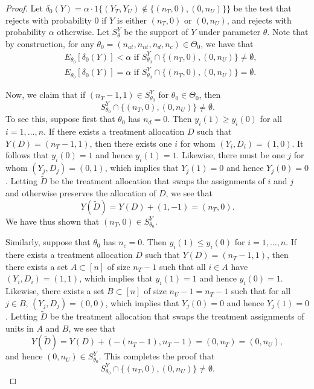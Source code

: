 \documentclass[12pt,reqno]{amsart}
\begin{document}
\propunbiasedexists*
\begin{proof}
Let $\delta_0(Y) = \alpha \cdot 1\{ (Y_T,Y_U) \not\in \{ (n_T,0), (0,n_U) \} \} $ be the test that rejects with probability $0$ if $Y$ is either $(n_T,0)$ or $(0,n_U)$, and rejects with probability $\alpha$ otherwise. Let $S^Y_\theta$ be the support of $Y$ under parameter $\theta$. Note that by construction, for any $\theta_0 = (n_{at},n_{nt}, n_d, n_c) \in \Theta_0$, we have that 
\begin{align*}
& E_{\theta_0 }[\delta_0(Y)]  < \alpha \text{ if } S^Y_{\theta_0} \cap  \{ (n_T,0), (0,n_U) \} \neq \emptyset, \\
& E_{\theta_0 }[\delta_0(Y)]  =  \alpha \text{ if } S^Y_{\theta_0} \cap  \{ (n_T,0), (0,n_U) \}  = \emptyset .
\end{align*}

Now, we claim that if $(n_T -1 , 1) \in S_{\theta_0}^Y$ for $\theta_0 \in \Theta_0$, then
\[
S^Y_{\theta_0} \cap  \{ (n_T,0), (0,n_U) \}  \neq \emptyset .
\]
To see this, suppose first that $\theta_0$ has $n_d = 0$. Then $y_i(1) \geq y_i(0)$ for all $i= 1,\ldots,n$. If there exists a treatment allocation $D$ such that $Y(D) = (n_T-1,1)$, then there exists one $i$ for whom $(Y_i,D_i) = (1,0)$. It follows that $y_i(0) = 1$ and hence $y_i(1)=1$. Likewise, there must be one $j$ for whom $(Y_j,D_j) = (0,1)$, which implies that $Y_j(1) = 0$ and hence $Y_j(0) = 0$. Letting $\tilde{D}$ be the treatment allocation that swaps the assignments of $i$ and $j$ and otherwise preserves the allocation of $D$, we see that
\[
Y(\tilde{D}) = Y(D) + (1,-1) = (n_T,0).
\]
We have thus shown that $(n_T,0) \in S^Y_{\theta_0}$.

Similarly, suppose that $\theta_0$ has $n_c = 0$. Then $y_i(1) \leq y_i(0)$ for $i=1,\ldots,n$. If there exists a treatment allocation $D$ such that $Y(D) = (n_T-1,1)$, then there exists a set $A \subset [n]$ of size $n_T-1$ such that all $i \in A$ have $(Y_i,D_i) = (1,1)$, which implies that $y_i(1) = 1$ and hence $y_i(0) = 1$. Likewise, there exists a set $B \subset [n]$ of size $n_U - 1 = n_T - 1$ such that for all $j \in B$, $(Y_j,D_j) = (0,0)$, which implies that $Y_j(0) = 0$ and hence $Y_j(1) = 0$. Letting $\tilde{D}$ be the treatment allocation that swaps the treatment assignments of units in $A$ and $B$, we see that
\[
Y(\tilde{D}) = Y(D) + (-(n_T-1),n_T-1) = (0,n_T) = (0,n_U),
\]
and hence $(0,n_U) \in S^Y_{\theta_0}$. This completes the proof that
\[
S^Y_{\theta_0} \cap  \{ (n_T,0), (0,n_U) \}  \neq \emptyset .
\]


\end{proof}
\end{document}
